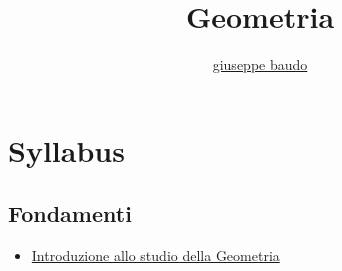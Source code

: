 \documentclass[a4paper,10pt]{article}
\title{Geometria}
\author{\href{http://www.baudo.hol.es}{giuseppe baudo}}
\begin{document}
\maketitle

\section*{Syllabus}

\subsection*{Fondamenti}
  \begin{itemize}
   \item \href{IntroduzioneGeometria.html}{Introduzione allo studio della Geometria}
  \end{itemize}  
\end{document}

